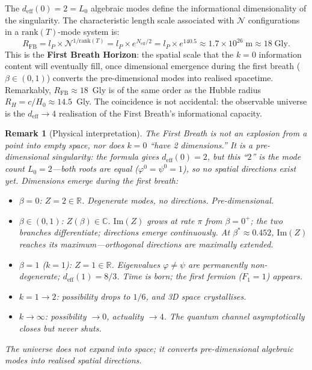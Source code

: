 \documentclass[12pt,a4paper]{article}
\newtheorem{remark}[theorem]{Remark}
\begin{document}
The $d_{\mathrm{eff}}(0) = 2 = L_0$ algebraic modes define the informational dimensionality of the singularity.  The characteristic length scale associated with $\mathcal{N}$ configurations in a $\mathrm{rank}(T)$-mode system is:
\begin{equation}
R_{\mathrm{FB}} = l_P \times \mathcal{N}^{1/\mathrm{rank}(T)} = l_P \times e^{N_{\mathrm{eff}}/2} = l_P \times e^{140.5} \approx 1.7 \times 10^{26}\;\mathrm{m} \approx 18\;\mathrm{Gly}.
\label{eq:first-breath-horizon}
\end{equation}
This is the \textbf{First Breath Horizon}: the spatial scale that the $k = 0$ information content will eventually fill, once dimensional emergence during the first breath ($\beta \in (0,1)$) converts the pre-dimensional modes into realised spacetime.  Remarkably, $R_{\mathrm{FB}} \approx 18$~Gly is of the same order as the Hubble radius $R_H = c/H_0 \approx 14.5$~Gly.  The coincidence is not accidental: the observable universe is the $d_{\mathrm{eff}} \to 4$ realisation of the First Breath's informational capacity.

\begin{remark}[Physical interpretation]
The First Breath is not an explosion from a point into empty space, nor does $k = 0$ ``have 2 dimensions.''  It is a \emph{pre-dimensional} singularity: the formula gives $d_{\mathrm{eff}}(0) = 2$, but this ``$2$'' is the mode count $L_0 = 2$---both roots are equal ($\varphi^0 = \psi^0 = 1$), so no spatial directions exist yet.  Dimensions emerge \emph{during} the first breath:
\begin{itemize}[nosep]
\item $\beta = 0$: $Z = 2 \in \mathbb{R}$. Degenerate modes, no directions. Pre-dimensional.
\item $\beta \in (0,1)$: $Z(\beta) \in \mathbb{C}$. $\mathrm{Im}(Z)$ grows at rate $\pi$ from $\beta = 0^+$; the two branches differentiate; directions emerge continuously.  At $\beta^* \approx 0.452$, $\mathrm{Im}(Z)$ reaches its maximum---orthogonal directions are maximally extended.
\item $\beta = 1$ ($k = 1$): $Z = 1 \in \mathbb{R}$. Eigenvalues $\varphi \neq \psi$ are permanently non-degenerate; $d_{\mathrm{eff}}(1) = 8/3$. Time is born; the first fermion ($F_1 = 1$) appears.
\item $k = 1 \to 2$: possibility drops to $1/6$, and 3D space crystallises.
\item $k \to \infty$: possibility $\to 0$, actuality $\to 4$. The quantum channel asymptotically closes but never shuts.
\end{itemize}
The universe does not expand \emph{into} space; it converts pre-dimensional algebraic modes \emph{into} realised spatial directions.
\end{remark}
\end{document}
